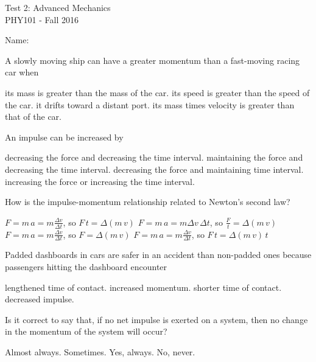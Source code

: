 \documentclass{exam}
\begin{document}
\begin{center}
  Test 2: Advanced Mechanics\\

  PHY101 - Fall 2016\\
\end{center}
Name:\\

\begin{questions}

\question A slowly moving ship can have a greater momentum than a fast-moving racing car when
\begin{choices}
  \choice its mass is greater than the mass of the car.
  \choice its speed is greater than the speed of the car.
  \choice it drifts toward a distant port.
  \choice its mass times velocity is greater than that of the car.
\end{choices}
\vfill{}

\question An impulse can be increased by
\begin{choices}
  \choice decreasing the force and decreasing the time interval.
  \choice maintaining the force and decreasing the time interval.
  \choice decreasing the force and maintaining time interval.
  \choice increasing the force or increasing the time interval.
\end{choices}
\vfill{}

\question How is the impulse-momentum relationship related to Newton's second law?
\begin{choices}
  \choice \(F=m\,a=m\frac{\Delta v}{\Delta t}\), so \(F\,t=\Delta\left(m\,v\right)\)
  \choice \(F=m\,a=m\Delta v\,\Delta t\), so \(\frac{F}{t}=\Delta\left(m\,v\right)\)
  \choice \(F=m\,a=m\frac{\Delta v}{\Delta t}\), so \(F=\Delta\left(m\,v\right)\)
  \choice \(F=m\,a=m\frac{\Delta v}{\Delta t}\), so \(F\,t=\Delta\left(m\,v\right)\,t\)
\end{choices}
\vfill{}

\question Padded dashboards in cars are safer in an accident than non-padded ones 
          because passengers hitting the dashboard encounter
\begin{choices}
  \choice lengthened time of contact.
  \choice increased momentum.
  \choice shorter time of contact.
  \choice decreased impulse.
\end{choices}
\vfill{}

\question Is it correct to say that, if no net impulse is exerted on a system, then no change in the momentum of the system will occur? 
\begin{choices}
  \choice Almost always.
  \choice Sometimes. 
  \choice Yes, always. 
  \choice No, never. 
\end{choices}
\vfill{}


\end{questions}
\end{document}
